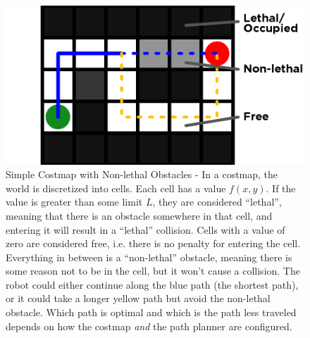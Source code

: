 \begin{figure}
\includegraphics[width=\columnwidth]{graphix/Intro.png}
\caption{Simple Costmap with Non-lethal Obstacles -  In a costmap, the world is discretized into cells. Each cell has a value $f(x,y)$. If the value is greater than some limit $L$, they are considered ``lethal'', meaning that there is an obstacle somewhere in that cell, and entering it will result in a ``lethal'' collision. Cells with a value of zero are considered free, i.e. there is no penalty for entering the cell. Everything in between is a ``non-lethal'' obstacle, meaning there is some reason not to be in the cell, but it won't cause a collision. The robot could either continue along the blue path (the shortest path), or it could take a longer yellow path but avoid the non-lethal obstacle. Which path is optimal and which is the path less traveled depends on how the costmap \emph{and} the path planner are configured. }
\label{fig:intro}
\end{figure}
